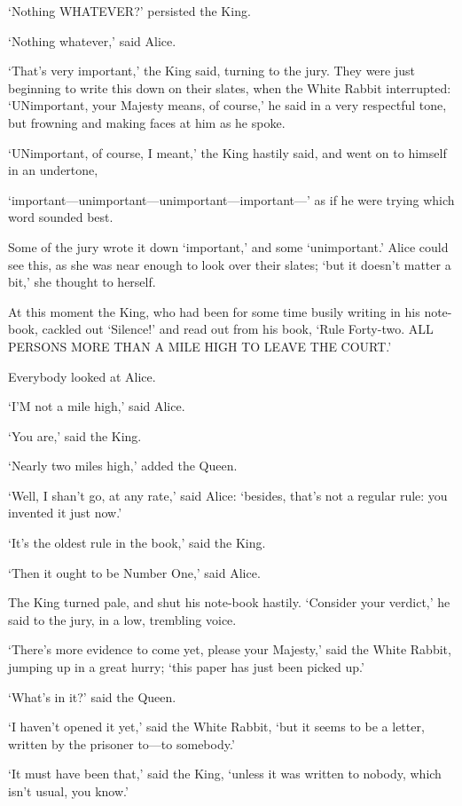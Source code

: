 \documentclass[12pt]{book}
\begin{document}
\begin{Parallel}[p]{}{}
{‘Nothing WHATEVER?’ persisted the King.

‘Nothing whatever,’ said Alice.

‘That’s very important,’ the King said, turning to the jury. They were just beginning to write this down on their slates, when the White Rabbit interrupted: ‘UNimportant, your Majesty means, of course,’ he said in a very respectful tone, but frowning and making faces at him as he spoke.

‘UNimportant, of course, I meant,’ the King hastily said, and went on to himself in an undertone,

‘important—unimportant—unimportant—important—’ as if he were trying which word sounded best.

Some of the jury wrote it down ‘important,’ and some ‘unimportant.’ Alice could see this, as she was near enough to look over their slates; ‘but it doesn’t matter a bit,’ she thought to herself.

At this moment the King, who had been for some time busily writing in his note-book, cackled out ‘Silence!’ and read out from his book, ‘Rule Forty-two. ALL PERSONS MORE THAN A MILE HIGH TO LEAVE THE COURT.’

Everybody looked at Alice.

‘I’M not a mile high,’ said Alice.

‘You are,’ said the King.

‘Nearly two miles high,’ added the Queen.

‘Well, I shan’t go, at any rate,’ said Alice: ‘besides, that’s not a regular rule: you invented it just now.’

‘It’s the oldest rule in the book,’ said the King.

‘Then it ought to be Number One,’ said Alice.

The King turned pale, and shut his note-book hastily. ‘Consider your verdict,’ he said to the jury, in a low, trembling voice.

‘There’s more evidence to come yet, please your Majesty,’ said the White Rabbit, jumping up in a great hurry; ‘this paper has just been picked up.’

‘What’s in it?’ said the Queen.

‘I haven’t opened it yet,’ said the White Rabbit, ‘but it seems to be a letter, written by the prisoner to—to somebody.’

‘It must have been that,’ said the King, ‘unless it was written to nobody, which isn’t usual, you know.’

}
\end{Parallel}
\end{document}
